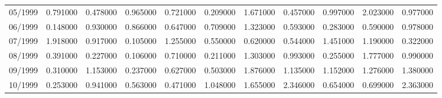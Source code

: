 \begin{tabular}{lrrrrrrrrrr}
05/1999 & 0.791000 & 0.478000 & 0.965000 & 0.721000 & 0.209000 & 1.671000 & 0.457000 & 0.997000 & 2.023000 & 0.977000 \\
06/1999 & 0.148000 & 0.930000 & 0.866000 & 0.647000 & 0.709000 & 1.323000 & 0.593000 & 0.283000 & 0.590000 & 0.978000 \\
07/1999 & 1.918000 & 0.917000 & 0.105000 & 1.255000 & 0.550000 & 0.620000 & 0.544000 & 1.451000 & 1.190000 & 0.322000 \\
08/1999 & 0.391000 & 0.227000 & 0.106000 & 0.710000 & 0.211000 & 1.303000 & 0.993000 & 0.255000 & 1.777000 & 0.990000 \\
09/1999 & 0.310000 & 1.153000 & 0.237000 & 0.627000 & 0.503000 & 1.876000 & 1.135000 & 1.152000 & 1.276000 & 1.380000 \\
10/1999 & 0.253000 & 0.941000 & 0.563000 & 0.471000 & 1.048000 & 1.655000 & 2.346000 & 0.654000 & 0.699000 & 2.363000 \\
\bottomrule
\end{tabular}
